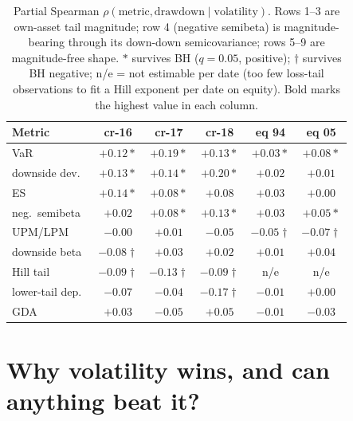 \documentclass[sigconf,nonacm]{acmart}
\begin{document}
\begin{table}[t]
\centering
\caption{Partial Spearman $\rho(\text{metric},\text{drawdown}\mid\text{volatility})$.
Rows 1--3 are own-asset tail magnitude; row 4 (negative semibeta) is magnitude-bearing
through its down-down semicovariance; rows 5--9 are magnitude-free shape. $\ast$ survives
BH ($q=0.05$, positive); $\dagger$ survives BH negative; n/e = not estimable per date
(too few loss-tail observations to fit a Hill exponent per date on equity). Bold marks the
highest value in each column.}
\label{tab:partials}
\small
\begin{tabular}{lccccc}
\toprule
Metric & cr-16 & cr-17 & cr-18 & eq 94 & eq 05 \\
\midrule
VaR & $+0.12\ast$ & $\mathbf{+0.19}\ast$ & $+0.13\ast$ & $\mathbf{+0.03}\ast$ & $\mathbf{+0.08}\ast$ \\
downside dev. & $+0.13\ast$ & $+0.14\ast$ & $\mathbf{+0.20}\ast$ & $+0.02$ & $+0.01$ \\
ES~\cite{rockafellar2000} & $\mathbf{+0.14}\ast$ & $+0.08\ast$ & $+0.08$ & $\mathbf{+0.03}$ & $+0.00$ \\
neg.\ semibeta~\cite{bpq2022} & $+0.02$ & $+0.08\ast$ & $+0.13\ast$ & $\mathbf{+0.03}$ & $+0.05\ast$ \\
UPM/LPM~\cite{violenawrocki2016} & $-0.00$ & $+0.01$ & $-0.05$ & $-0.05\dagger$ & $-0.07\dagger$ \\
downside beta~\cite{ang2006} & $-0.08\dagger$ & $+0.03$ & $+0.02$ & $+0.01$ & $+0.04$ \\
Hill tail~\cite{kellyjiang2014} & $-0.09\dagger$ & $-0.13\dagger$ & $-0.09\dagger$ & n/e & n/e \\
lower-tail dep.~\cite{chabiyo2018} & $-0.07$ & $-0.04$ & $-0.17\dagger$ & $-0.01$ & $+0.00$ \\
GDA~\cite{faragotedongap2018} & $+0.03$ & $-0.05$ & $+0.05$ & $-0.01$ & $-0.03$ \\
\bottomrule
\end{tabular}
\end{table}

\section{Why volatility wins, and can anything beat it?}\label{sec:why}
\end{document}
